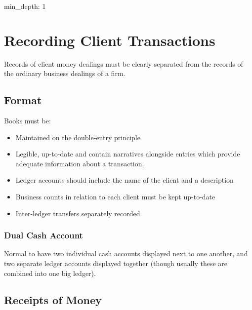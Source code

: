 \documentclass[
]{article}
\author{}
\date{}
\newenvironment{Shaded}{}{}
\newcommand{\NormalTok}[1]{#1}
\providecommand{\tightlist}{%
  \setlength{\itemsep}{0pt}\setlength{\parskip}{0pt}}
\begin{document}
{
\setcounter{tocdepth}{3}
\tableofcontents
}
\begin{Shaded}
\begin{Highlighting}[]
\NormalTok{min\_depth: 1}
\end{Highlighting}
\end{Shaded}

\hypertarget{recording-client-transactions}{%
\section{Recording Client
Transactions}\label{recording-client-transactions}}

Records of client money dealings must be clearly separated from the
records of the ordinary business dealings of a firm.

\hypertarget{format}{%
\subsection{Format}\label{format}}

Books must be:

\begin{itemize}
\tightlist
\item
  Maintained on the double-entry principle
\item
  Legible, up-to-date and contain narratives alongside entries which
  provide adequate information about a transaction.
\item
  Ledger accounts should include the name of the client and a
  description
\item
  Business counts in relation to each client must be kept up-to-date
\item
  Inter-ledger transfers separately recorded.
\end{itemize}

\hypertarget{dual-cash-account}{%
\subsubsection{Dual Cash Account}\label{dual-cash-account}}

Normal to have two individual cash accounts displayed next to one
another, and two separate ledger accounts displayed together (though
usually these are combined into one big ledger).

\hypertarget{receipts-of-money}{%
\subsection{Receipts of Money}\label{receipts-of-money}}
\end{document}
